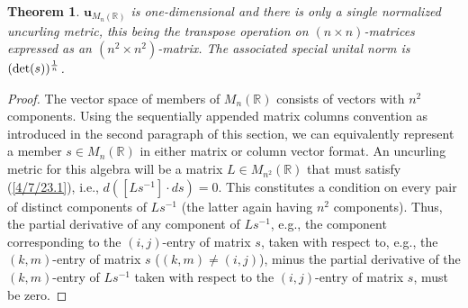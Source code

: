 \documentclass{amsart}
\numberwithin{equation}{section}
\newtheorem{theorem}{Theorem}
\theoremstyle{definition}
\numberwithin{theorem}{section}
\begin{document}
   
 \begin{theorem} \label{4/8/22.1} $\mathbf{u}_{M_n(\mathbb{R})}$ is one-dimensional and there is only a single normalized uncurling metric, this being the  transpose operation on $(n\times n)$-matrices expressed as an $(n^2\times n^2)$-matrix. The associated special unital norm is $({\rm det}(s))^{\frac{1}{n}}$. \end{theorem}
 \begin{proof} The vector space of members of $ M_n(\mathbb{R})$ consists of  vectors with $n^2$ components.   Using the sequentially appended matrix columns convention as introduced in the second paragraph of this section, we can equivalently represent a member $s\in M_n(\mathbb{R})$ in either matrix or column vector format.   An uncurling metric for this algebra will be a matrix $L\in M_{n^2}(\mathbb{R})$ that must satisfy (\ref{4/7/23.1}), i.e., $d\left([Ls^{-1}]\cdot ds\right)=0$. This constitutes a condition on every pair of distinct components of $Ls^{-1}$ (the latter again having $n^2$ components).  Thus,  the partial derivative of any component of $Ls^{-1}$, e.g., the component corresponding to the $(i,j)$-entry of matrix $s$, taken with respect to, e.g., the $(k,m)$-entry of matrix $s$ ($(k,m)\ne (i,j)$),  minus  the partial derivative of the $(k,m)$-entry of $Ls^{-1}$  taken with respect to the $(i,j)$-entry of matrix $s$, must be zero.
 

\end{proof}
\end{document}
